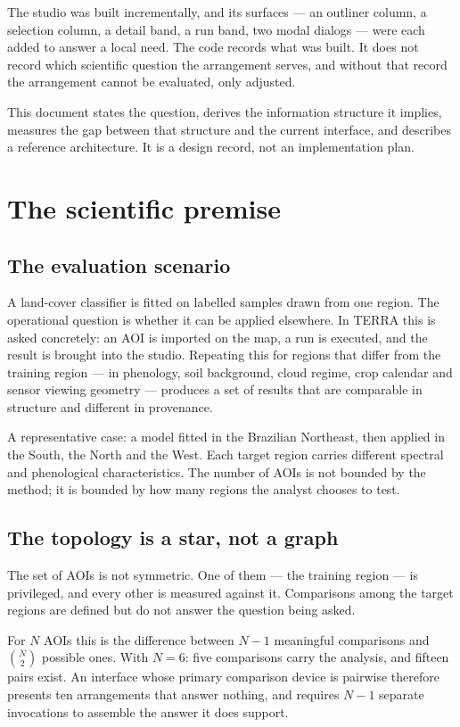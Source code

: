 \documentclass[11pt,a4paper]{article}
\begin{document}
The studio was built incrementally, and its surfaces --- an outliner column, a
selection column, a detail band, a run band, two modal dialogs --- were each
added to answer a local need. The code records what was built. It does not
record which scientific question the arrangement serves, and without that
record the arrangement cannot be evaluated, only adjusted.

This document states the question, derives the information structure it
implies, measures the gap between that structure and the current interface, and
describes a reference architecture. It is a design record, not an
implementation plan.

\section{The scientific premise}

\subsection{The evaluation scenario}

A land-cover classifier is fitted on labelled samples drawn from one region.
The operational question is whether it can be applied elsewhere. In TERRA this
is asked concretely: an AOI is imported on the map, a run is executed, and the
result is brought into the studio. Repeating this for regions that differ from
the training region --- in phenology, soil background, cloud regime, crop
calendar and sensor viewing geometry --- produces a set of results that are
comparable in structure and different in provenance.

A representative case: a model fitted in the Brazilian Northeast, then applied
in the South, the North and the West. Each target region carries different
spectral and phenological characteristics. The number of AOIs is not bounded by
the method; it is bounded by how many regions the analyst chooses to test.

\subsection{The topology is a star, not a graph}

The set of AOIs is not symmetric. One of them --- the training region --- is
privileged, and every other is measured against it. Comparisons among the
target regions are defined but do not answer the question being asked.

For $N$ AOIs this is the difference between $N-1$ meaningful comparisons and
$\binom{N}{2}$ possible ones. With $N=6$: five comparisons carry the analysis,
and fifteen pairs exist. An interface whose primary comparison device is
pairwise therefore presents ten arrangements that answer nothing, and requires
$N-1$ separate invocations to assemble the answer it does support.
\end{document}
